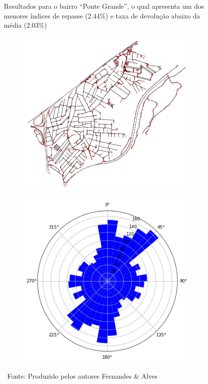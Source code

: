 \begin{figure}[htb]
    \centering
    \caption{Resultados para o bairro ``Ponte Grande'', o qual apresenta um dos menores índices de repasse (2.44\%) e taxa de devolução abaixo da média (2.03\%)}
    \begin{subfigure}{0.42\textwidth}
        \includegraphics[height=0.75\textwidth]{images/5_emp_bebidas/street_network_analysis/Ponte_grande_malha.png}
    \end{subfigure}
    \begin{subfigure}{0.42\textwidth}
        \includegraphics[height=0.75\textwidth]{images/5_emp_bebidas/street_network_analysis/ponte_grande_polar_plot.png}
    \end{subfigure}
    \caption*{\ Fonte: Produzido pelos autores Fernandes \& Alves}
    \label{fig:melhorbairro_label}
\end{figure} %

